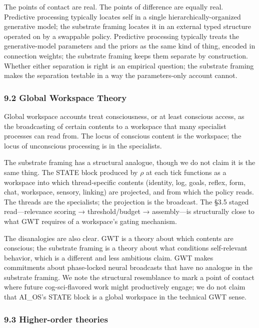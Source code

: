\documentclass[11pt,letterpaper]{article}
\begin{document}
The points of contact are real. The points of difference are equally real. Predictive processing typically locates self in a single hierarchically-organized generative model; the substrate framing locates it in an external typed structure operated on by a swappable policy. Predictive processing typically treats the generative-model parameters and the priors as the same kind of thing, encoded in connection weights; the substrate framing keeps them separate by construction. Whether either separation is right is an empirical question; the substrate framing makes the separation testable in a way the parameters-only account cannot.

\subsubsection*{9.2 Global Workspace Theory}

Global workspace accounts treat consciousness, or at least conscious access, as the broadcasting of certain contents to a workspace that many specialist processes can read from. The locus of conscious content is the workspace; the locus of unconscious processing is in the specialists.

The substrate framing has a structural analogue, though we do not claim it is the same thing. The STATE block produced by $\rho$ at each tick functions as a workspace into which thread-specific contents (identity, log, goals, reflex, form, chat, workspace, sensory, linking) are projected, and from which the policy reads. The threads are the specialists; the projection is the broadcast. The §3.5 staged read---relevance scoring → threshold/budget → assembly---is structurally close to what GWT requires of a workspace's gating mechanism.

The disanalogies are also clear. GWT is a theory about which contents are conscious; the substrate framing is a theory about what conditions self-relevant behavior, which is a different and less ambitious claim. GWT makes commitments about phase-locked neural broadcasts that have no analogue in the substrate framing. We note the structural resemblance to mark a point of contact where future cog-sci-flavored work might productively engage; we do not claim that AI\_OS's STATE block is a global workspace in the technical GWT sense.

\subsubsection*{9.3 Higher-order theories}
\end{document}

